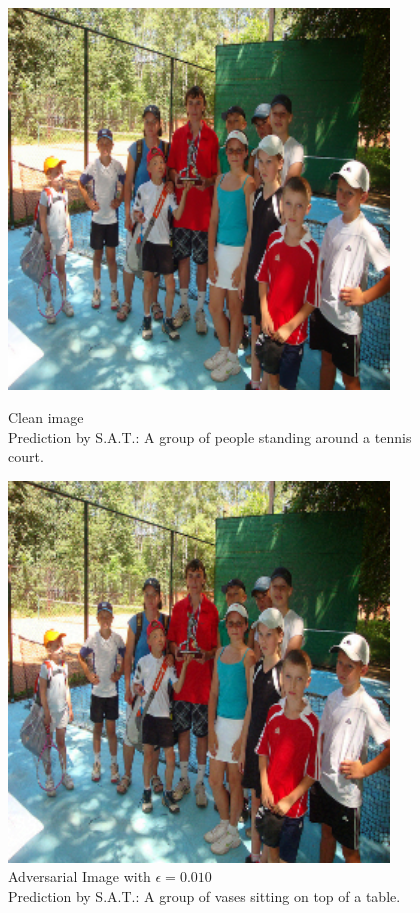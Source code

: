 \begin{figure}[ht]
    \centering
    \begin{minipage}{0.45\textwidth}
        \centering
        \includegraphics[width=0.9\textwidth]{figures/fast_method_group_of_people/group_of_people_0.000.png} %
        \caption*{Clean image\\Prediction by S.A.T.: A group of people standing around a tennis court.}
    \end{minipage}\hfill
    \begin{minipage}{0.45\textwidth}
        \centering
        \includegraphics[width=0.9\textwidth]{figures/fast_method_group_of_people/group_of_people_0.010.png} %
        \caption*{Adversarial Image with $\epsilon=0.010$\\Prediction by S.A.T.: A group of vases sitting on top of a table.}
    \end{minipage}
\end{figure}

